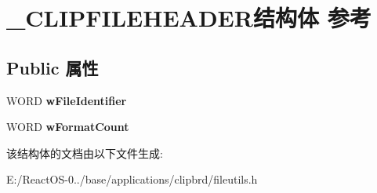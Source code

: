 \hypertarget{struct___c_l_i_p_f_i_l_e_h_e_a_d_e_r}{}\section{\+\_\+\+C\+L\+I\+P\+F\+I\+L\+E\+H\+E\+A\+D\+E\+R结构体 参考}
\label{struct___c_l_i_p_f_i_l_e_h_e_a_d_e_r}
\subsection*{Public 属性}
\begin{DoxyCompactItemize}
\item 
\mbox{\label{struct___c_l_i_p_f_i_l_e_h_e_a_d_e_r_a50bc36bb8a602483a3851a370153e396}} 
W\+O\+RD {\bfseries w\+File\+Identifier}
\item 
\mbox{\label{struct___c_l_i_p_f_i_l_e_h_e_a_d_e_r_a32031da93d50d41d9e1ffa7b7093a745}} 
W\+O\+RD {\bfseries w\+Format\+Count}
\end{DoxyCompactItemize}


该结构体的文档由以下文件生成\+:\begin{DoxyCompactItemize}
\item 
E\+:/\+React\+O\+S-\/0../base/applications/clipbrd/fileutils.\+h\end{DoxyCompactItemize}
